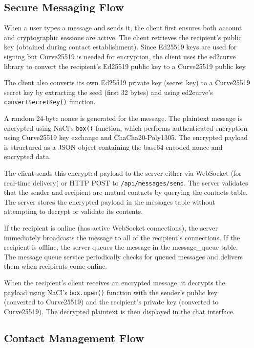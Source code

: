 \documentclass[12pt,a4paper,openany]{book}
\begin{document}
\subsection{Secure Messaging Flow}

When a user types a message and sends it, the client first ensures both account and cryptographic sessions are active. The client retrieves the recipient's public key (obtained during contact establishment). Since Ed25519 keys are used for signing but Curve25519 \cite{rfc7748} is needed for encryption, the client uses the ed2curve library \cite{ed2curve} to convert the recipient's Ed25519 public key to a Curve25519 public key.

The client also converts its own Ed25519 private key (secret key) to a Curve25519 secret key by extracting the seed (first 32 bytes) and using ed2curve's \cite{ed2curve} \texttt{convertSecretKey()} function.

A random 24-byte nonce is generated for the message. The plaintext message is encrypted using NaCl's \cite{nacl} \texttt{box()} function, which performs authenticated encryption using Curve25519 key exchange and ChaCha20-Poly1305. The encrypted payload is structured as a JSON object containing the base64-encoded nonce and encrypted data.

The client sends this encrypted payload to the server either via WebSocket (for real-time delivery) or HTTP POST to \texttt{/api/messages/send}. The server validates that the sender and recipient are mutual contacts by querying the contacts table. The server stores the encrypted payload in the messages table without attempting to decrypt or validate its contents.

If the recipient is online (has active WebSocket connections), the server immediately broadcasts the message to all of the recipient's connections. If the recipient is offline, the server queues the message in the message\_queue table. The message queue service periodically checks for queued messages and delivers them when recipients come online.

When the recipient's client receives an encrypted message, it decrypts the payload using NaCl's \texttt{box.open()} function with the sender's public key (converted to Curve25519) and the recipient's private key (converted to Curve25519). The decrypted plaintext is then displayed in the chat interface.

\subsection{Contact Management Flow}
\end{document}
